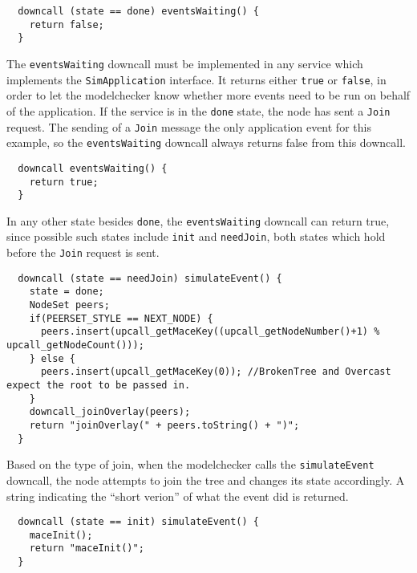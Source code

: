 \documentclass[12pt,letterpaper]{article}
\newenvironment{code}
{\begin{list}{}{\setlength{\leftmargin}{1em}}\item\scriptsize\bfseries}
{\end{list}}
\begin{document}
\begin{code}
\begin{verbatim} 
  downcall (state == done) eventsWaiting() {
    return false;
  }
\end{verbatim}
\end{code}

The \texttt{eventsWaiting} downcall must be implemented in any service which implements the \texttt{SimApplication} interface.  It returns either \texttt{true} or \texttt{false}, in order to let the modelchecker know whether more events need to be run on behalf of the application.  If the service is in the \texttt{done} state, the node has sent a \texttt{Join} request.  The sending of a \texttt{Join} message  the only application event for this example, so the \texttt{eventsWaiting} downcall always returns false from this downcall.

\begin{code}
\begin{verbatim} 
  downcall eventsWaiting() {
    return true;
  }
\end{verbatim}
\end{code}

In any other state besides \texttt{done}, the \texttt{eventsWaiting} downcall can return true, since possible such states include \texttt{init} and \texttt{needJoin}, both states which hold before the \texttt{Join} request is sent.  

\begin{code}
\begin{verbatim}
  downcall (state == needJoin) simulateEvent() {
    state = done;
    NodeSet peers;
    if(PEERSET_STYLE == NEXT_NODE) {
      peers.insert(upcall_getMaceKey((upcall_getNodeNumber()+1) % upcall_getNodeCount()));
    } else {
      peers.insert(upcall_getMaceKey(0)); //BrokenTree and Overcast expect the root to be passed in.
    }
    downcall_joinOverlay(peers);
    return "joinOverlay(" + peers.toString() + ")";
  } 
\end{verbatim}
\end{code}

Based on the type of join, when the modelchecker calls the \texttt{simulateEvent} downcall, the node attempts to join the tree and changes its state accordingly.  A string indicating the ``short verion'' of what the event did is returned.  

\begin{code}
\begin{verbatim} 
  downcall (state == init) simulateEvent() {
    maceInit();
    return "maceInit()";
  }
\end{verbatim}
\end{code}
\end{document}
